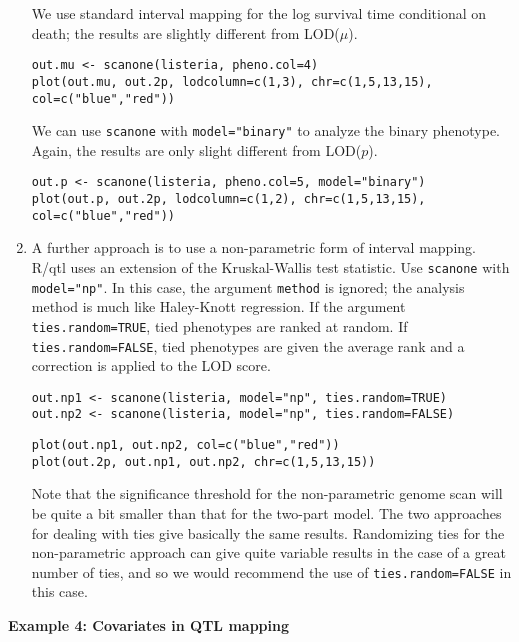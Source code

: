\documentclass[10pt,letterpaper]{article}
\newcommand{\usercolor}{\color [named]{BlueViolet}}
\begin{document}
\begin{enumerate}
We use standard interval mapping for the log survival time conditional
on death; the results are slightly different from LOD($\mu$).

\usercolor
\verb|out.mu <- scanone(listeria, pheno.col=4)| \\
\verb|plot(out.mu, out.2p, lodcolumn=c(1,3), chr=c(1,5,13,15), col=c("blue","red"))|
\normalcolor

We can use \verb-scanone- with \verb-model="binary"- to analyze the
binary phenotype.  Again, the results are only slight different from
LOD($p$). 

\usercolor
\verb|out.p <- scanone(listeria, pheno.col=5, model="binary")| \\
\verb|plot(out.p, out.2p, lodcolumn=c(1,2), chr=c(1,5,13,15), col=c("blue","red"))|
\normalcolor

\item A further approach is to use a non-parametric form of interval
mapping.  R/qtl uses an extension of the Kruskal-Wallis test
statistic.  Use \verb-scanone- with \verb-model="np"-.  In this case,
the argument \verb-method- is ignored; the analysis method is much
like Haley-Knott regression.  If the argument \verb-ties.random=TRUE-,
tied phenotypes are ranked at random.  If \verb-ties.random=FALSE-,
tied phenotypes are given the average rank and a correction is applied
to the LOD score.

\usercolor
\verb|out.np1 <- scanone(listeria, model="np", ties.random=TRUE)| \\
\verb|out.np2 <- scanone(listeria, model="np", ties.random=FALSE)| 

\verb|plot(out.np1, out.np2, col=c("blue","red"))| \\
\verb|plot(out.2p, out.np1, out.np2, chr=c(1,5,13,15))|
\normalcolor

Note that the significance threshold for the non-parametric genome
scan will be quite a bit smaller than that for the two-part model.
The two approaches for dealing with ties give basically the same
results.  Randomizing ties for the non-parametric approach can give
quite variable results in the case of a great number of ties, and so
we would recommend the use of \verb-ties.random=FALSE- in this case.

\end{enumerate}



\vspace{12pt}

\noindent \textbf{Example 4: Covariates in QTL mapping} \vspace{6pt}
\nopagebreak
\end{document}
